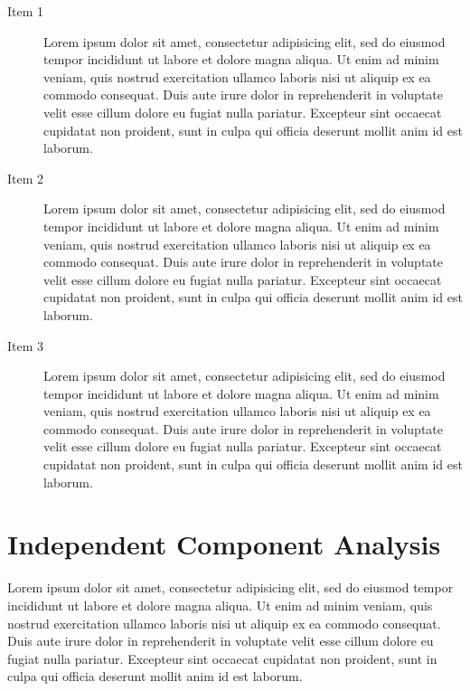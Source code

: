 \documentclass[5p]{elsarticle}
\begin{document}
\begin{description}
\item[Item 1] 

Lorem ipsum dolor sit amet, consectetur adipisicing elit, sed do eiusmod tempor incididunt ut labore et dolore magna aliqua. Ut enim ad minim veniam, quis nostrud exercitation ullamco laboris nisi ut aliquip ex ea commodo consequat. Duis aute irure dolor in reprehenderit in voluptate velit esse cillum dolore eu fugiat nulla pariatur. Excepteur sint occaecat cupidatat non proident, sunt in culpa qui officia deserunt mollit anim id est laborum.

\item[Item 2]

Lorem ipsum dolor sit amet, consectetur adipisicing elit, sed do eiusmod tempor incididunt ut labore et dolore magna aliqua. Ut enim ad minim veniam, quis nostrud exercitation ullamco laboris nisi ut aliquip ex ea commodo consequat. Duis aute irure dolor in reprehenderit in voluptate velit esse cillum dolore eu fugiat nulla pariatur. Excepteur sint occaecat cupidatat non proident, sunt in culpa qui officia deserunt mollit anim id est laborum.

\item[Item 3]

Lorem ipsum dolor sit amet, consectetur adipisicing elit, sed do eiusmod tempor incididunt ut labore et dolore magna aliqua. Ut enim ad minim veniam, quis nostrud exercitation ullamco laboris nisi ut aliquip ex ea commodo consequat. Duis aute irure dolor in reprehenderit in voluptate velit esse cillum dolore eu fugiat nulla pariatur. Excepteur sint occaecat cupidatat non proident, sunt in culpa qui officia deserunt mollit anim id est laborum.

\end{description}

\section{Independent Component Analysis}

Lorem ipsum dolor sit amet, consectetur adipisicing elit, sed do eiusmod tempor incididunt ut labore et dolore magna aliqua. Ut enim ad minim veniam, quis nostrud exercitation ullamco laboris nisi ut aliquip ex ea commodo consequat. Duis aute irure dolor in reprehenderit in voluptate velit esse cillum dolore eu fugiat nulla pariatur. Excepteur sint occaecat cupidatat non proident, sunt in culpa qui officia deserunt mollit anim id est laborum.
\end{document}
